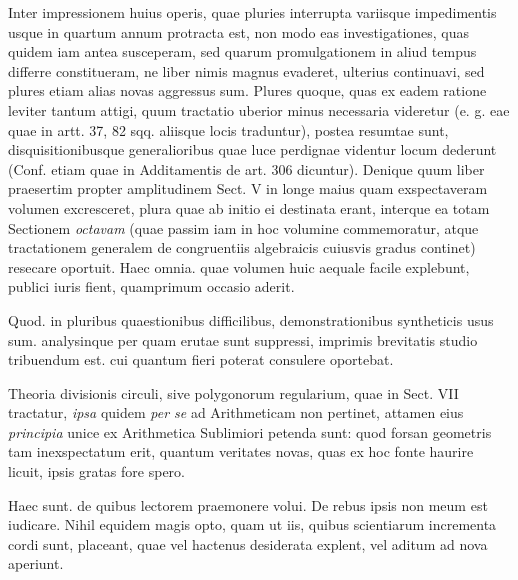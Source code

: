 Inter impressionem huius operis, quae pluries interrupta variisque impedimentis usque in quartum annum protracta est, non modo eas investigationes, quas quidem iam antea susceperam, sed quarum promulgationem in aliud tempus differre constitueram, ne liber nimis magnus evaderet, ulterius continuavi, sed plures etiam alias novas aggressus sum. Plures quoque, quas ex eadem ratione leviter tantum attigi, quum tractatio uberior minus necessaria videretur (e. g. eae quae in artt. 37, 82 sqq. aliisque locis traduntur), postea resumtae sunt, disquisitionibusque generalioribus quae luce perdignae videntur locum dederunt (Conf. etiam quae in Additamentis de art. 306 dicuntur). Denique quum liber praesertim propter amplitudinem Sect. V in longe maius quam exspectaveram volumen excresceret, plura quae ab initio ei destinata erant, interque ea totam Sectionem \emph{octavam} (quae passim iam in hoc volumine commemoratur, atque tractationem generalem de congruentiis algebraicis cuiusvis gradus continet) resecare oportuit. Haec omnia. quae volumen huic aequale facile explebunt, publici iuris fient, quamprimum occasio aderit.

Quod. in pluribus quaestionibus difficilibus, demonstrationibus syntheticis usus sum. analysinque per quam erutae sunt suppressi, imprimis brevitatis studio tribuendum est. cui quantum fieri poterat consulere oportebat.

Theoria divisionis circuli, sive polygonorum regularium, quae in Sect. VII tractatur, \emph{ipsa} quidem \emph{per se} ad Arithmeticam non pertinet, attamen eius \emph{principia} unice ex Arithmetica Sublimiori petenda sunt: quod forsan geometris tam inexspectatum erit, quantum veritates novas, quas ex hoc fonte haurire licuit, ipsis gratas fore spero.

Haec sunt. de quibus lectorem praemonere volui. De rebus ipsis non meum est iudicare. Nihil equidem magis opto, quam ut iis, quibus scientiarum incrementa cordi sunt, placeant, quae vel hactenus desiderata explent, vel aditum ad nova aperiunt.

